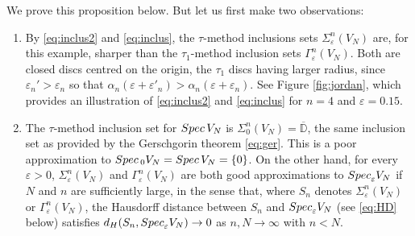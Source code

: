 \documentclass[preprint,1p,11pt]{elsarticle}
\newcommand\D{{\mathbb D}}
\newcommand\N{{\mathbb N}}
\newcommand\T{{\mathbb T}}
\newcommand\eps{{\varepsilon}}
\newcommand\Spec{{\rm Spec}\,}  %
\newcommand\Specn{{\rm Spec}}   %
\newcommand\Speps{{\rm Spec}_\eps}
\numberwithin{equation}{section}   %
\numberwithin{figure}{section}  %
\begin{document}
We prove this proposition below. But let us first make two observations:
\begin{enumerate}
\item By \eqref{eq:inclus2} and \eqref{eq:inclus}, the $\tau$-method inclusions sets $\Sigma_\eps^n(V_N)$ are, for this example, sharper than the $\tau_1$-method inclusion sets $\Gamma_\eps^n(V_N)$. Both are closed discs centred on the origin, the $\tau_1$ discs having  larger radius, since $\eps_n'>\eps_n$ so that $\alpha_n(\eps+\eps'_n)>\alpha_n(\eps+\eps_n)$.  See Figure \ref{fig:jordan}, which provides an illustration of \eqref{eq:inclus2} and \eqref{eq:inclus} for $n=4$ and $\eps=0.15$.
\item \label{point3} The $\tau$-method inclusion set for $\Spec V_N$ is $\Sigma_0^n(V_N)=\overline{\D}$, the same inclusion set as provided by the Gerschgorin theorem \eqref{eq:ger}.
This is a poor approximation to $\Spec_0 V_N = \Spec V_N=\{0\}$. On the other hand, for every $\eps>0$,  $\Sigma_\eps^n(V_N)$ and $\Gamma_\eps^n(V_N)$ are both good approximations to $\Speps V_N$ if $N$ and $n$ are sufficiently large, in the sense that, where $S_n$ denotes  $\Sigma_\eps^n(V_N)$ or $\Gamma_\eps^n(V_N)$,  the Hausdorff distance between $S_n$ and $\Speps V_N$ (see \eqref{eq:HD} below) satisfies $d_H(S_n,\Speps V_N)\to 0$ as $n,N\to \infty$ with $n< N$.
\end{enumerate}
 
\end{document}
